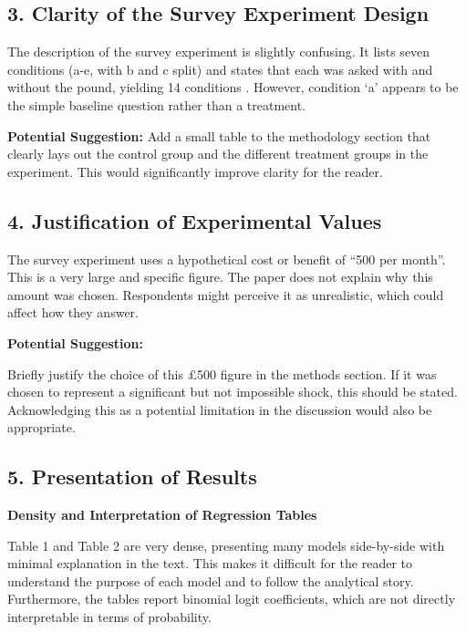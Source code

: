 \documentclass[
  letterpaper,
  DIV=11,
  numbers=noendperiod]{scrartcl}
\begin{document}
\subsection{3. Clarity of the Survey Experiment
Design}\label{clarity-of-the-survey-experiment-design}

The description of the survey experiment is slightly confusing. It lists
seven conditions (a-e, with b and c split) and states that each was
asked with and without the pound, yielding 14 conditions . However,
condition `a' appears to be the simple baseline question rather than a
treatment.

\textbf{Potential Suggestion:} Add a small table to the methodology
section that clearly lays out the control group and the different
treatment groups in the experiment. This would significantly improve
clarity for the reader.

\subsection{4. Justification of Experimental
Values}\label{justification-of-experimental-values}

The survey experiment uses a hypothetical cost or benefit of ``500 per
month''. This is a very large and specific figure. The paper does not
explain why this amount was chosen. Respondents might perceive it as
unrealistic, which could affect how they answer.

\textbf{Potential Suggestion:}

Briefly justify the choice of this £500 figure in the methods section.
If it was chosen to represent a significant but not impossible shock,
this should be stated. Acknowledging this as a potential limitation in
the discussion would also be appropriate.

\subsection{5. Presentation of Results}\label{presentation-of-results}

\textbf{Density and Interpretation of Regression Tables}

Table 1 and Table 2 are very dense, presenting many models side-by-side
with minimal explanation in the text. This makes it difficult for the
reader to understand the purpose of each model and to follow the
analytical story. Furthermore, the tables report binomial logit
coefficients, which are not directly interpretable in terms of
probability.
\end{document}
